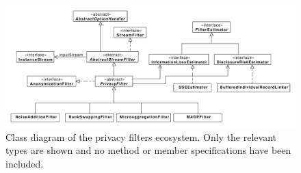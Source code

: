 \begin{figure}
	\centering
	\includegraphics[width=1.0\textwidth]{figures/refactored-ppsm-class-diagram.pdf}
	\caption{Class diagram of the privacy filters ecosystem. Only the relevant types are shown and no method or member specifications have been included.}
	\label{fig:moa-ppsm-class-uml}
\end{figure}